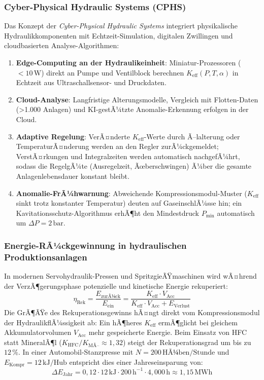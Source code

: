 ﻿\documentclass[a4paper,12pt]{scrreprt}
\theoremstyle{definition}
\begin{document}
\subsubsection{Cyber-Physical Hydraulic Systems (CPHS)}

Das Konzept der \emph{Cyber-Physical Hydraulic Systems} integriert
physikalische Hydraulikkomponenten mit Echtzeit-Simulation, digitalen
Zwillingen und cloudbasierten Analyse-Algorithmen:

\begin{enumerate}
  \item \textbf{Edge-Computing an der Hydraulikeinheit}: Miniatur-Prozessoren
    ($<10\,\mathrm{W}$) direkt an Pumpe und Ventilblock berechnen
    $K_{\mathrm{eff}}(P,T,\alpha)$ in Echtzeit aus Ultraschallsen\-sor-
    und Druckdaten.
  \item \textbf{Cloud-Analyse}: Langfristige Alterungsmodelle,
    Vergleich mit Flotten-Daten (>1.000 Anlagen) und KI-gestÃ¼tzte
    Anomalie-Erkennung erfolgen in der Cloud.
  \item \textbf{Adaptive Regelung}: VerÃ¤nderte $K_{\mathrm{eff}}$-Werte
    durch Ã–lalterung oder TemperaturÃ¤nderung werden an den Regler
    zurÃ¼ckgemeldet; VerstÃ¤rkungen und  Integralzeiten werden
    automatisch nachgefÃ¼hrt, sodass die RegelgÃ¼te (Ausregelzeit,
    Ãœberschwingen) Ã¼ber die gesamte Anlagenlebensdauer konstant bleibt.
  \item \textbf{Anomalie-FrÃ¼hwarnung}: Abweichende Kompressionsmodul-Muster
    ($K_{\mathrm{eff}}$ sinkt trotz konstanter Temperatur) deuten auf
    GaseinschlÃ¼sse hin; ein Kavitationsschutz-Algorithmus erhÃ¶ht den
    Mindestdruck $P_{\min}$ automatisch um $\Delta P = 2\,\mathrm{bar}$.
\end{enumerate}

\subsubsection{Energie-RÃ¼ckgewinnung in hydraulischen Produktionsanlagen}

In modernen Servohydraulik-Pressen und SpritzgieÃŸmaschinen wird
wÃ¤hrend der VerzÃ¶gerungsphase potenzielle und kinetische Energie
rekuperiert:
\begin{equation}
  \eta_{\mathrm{Rek}} = \frac{E_{\mathrm{zurÃ¼ck}}}{E_{\mathrm{ein}}}
    = \frac{K_{\mathrm{eff}} \cdot V_{\mathrm{Acc}}}{K_{\mathrm{eff}} \cdot V_{\mathrm{Acc}} + E_{\mathrm{Verlust}}}
  \label{eq:rekuperation}
\end{equation}
Die GrÃ¶ÃŸe des Rekuperationsgewinns hÃ¤ngt direkt vom
Kompressionsmodul der HydraulikflÃ¼ssigkeit ab: Ein hÃ¶heres
$K_{\mathrm{eff}}$ ermÃ¶glicht bei gleichem Akkumulatorvolumen
$V_{\mathrm{Acc}}$ mehr gespeicherte Energie. Beim Einsatz von HFC
statt MineralÃ¶l ($K_{\mathrm{HFC}}/K_{\mathrm{MÃ–}} \approx 1{,}32$)
steigt der Rekuperationsgrad um bis zu $12\,\%$. In einer Automobil-Stanzpresse
mit $N = 200\,\mathrm{HÃ¼ben/Stunde}$ und $E_{\mathrm{Kompr}} = 12\,\mathrm{kJ/Hub}$
entspricht dies einer Jahreseinsparung von:
\[
  \Delta E_{\mathrm{Jahr}}
    = 0{,}12 \cdot 12\,\mathrm{kJ} \cdot 200\,\mathrm{h}^{-1} \cdot 4{,}000\,\mathrm{h}
    \approx 1{,}15\,\mathrm{MWh}
\]
\end{document}
